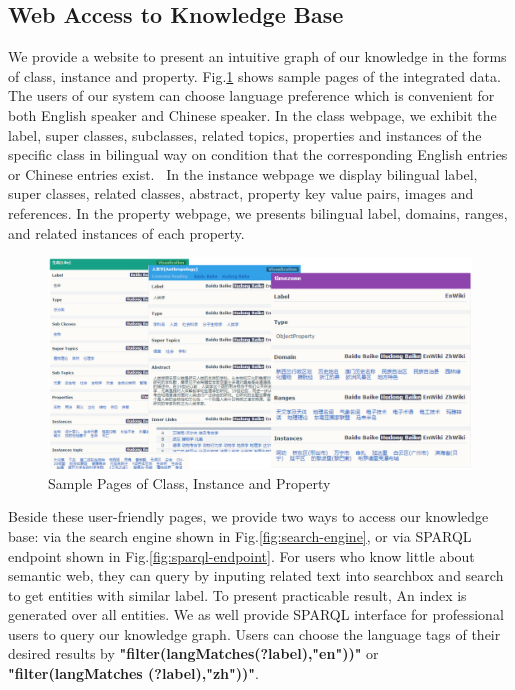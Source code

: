 \documentclass[runningheads,a4paper]{llncs}
\begin{document}
\subsection{Web Access to Knowledge Base}
We provide a website to present an intuitive graph of our knowledge in the forms of class, instance and property. Fig.\ref{fig:xlore} shows sample pages of the integrated data. The users of our system can choose language preference which is convenient for both English speaker and Chinese speaker. In the class webpage, we exhibit the label, super classes, subclasses, related topics, properties and instances of the specific class in bilingual way on condition that the corresponding English entries or Chinese entries exist.  In the instance webpage we display bilingual label, super classes, related classes, abstract, property key value pairs, images and references. In the property webpage, we presents bilingual label, domains, ranges, and related instances of each property. 
\begin{figure}[ht]
    \centerline{\includegraphics[width=1\columnwidth]{fig/xlore}}
    \label{fig:xlore}
    \caption{Sample Pages of Class, Instance and Property}
\end{figure}%
Beside these user-friendly pages, we provide two ways to access our knowledge base: via the search engine shown in Fig.\ref{fig:search-engine}, or via SPARQL endpoint shown in Fig.\ref{fig:sparql-endpoint}. For users who know little about semantic web, they can query by inputing related text into searchbox and search to get entities with similar label. To present practicable result, An index is generated over all entities. We as well provide SPARQL interface for professional users to query our knowledge graph. Users can choose the language tags of their desired results by \textbf{"filter(langMatches(?label),"en"))"} or \textbf{"filter(langMatches (?label),"zh"))"}.
\end{document}
